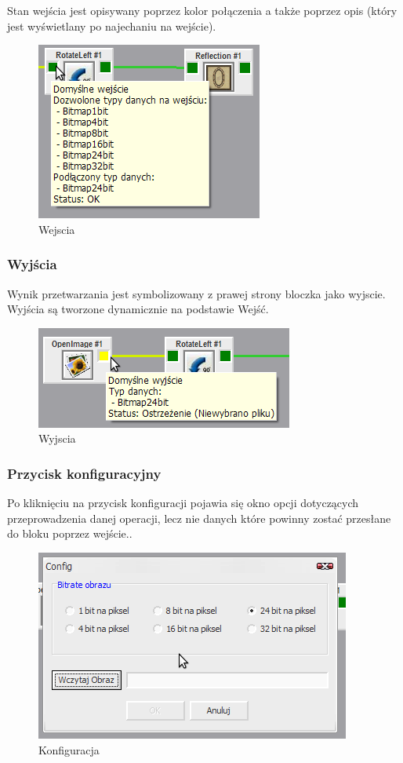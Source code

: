 \documentclass[a4paper,10pt]{article}
\begin{document}
Stan wejścia jest opisywany poprzez kolor połączenia a także poprzez opis (który jest wyświetlany po najechaniu na wejście).
\begin{figure}[h]
 \centering
 \includegraphics[scale=0.5]{wejscia}
 \caption{Wejscia}
 \label{fig:Input}
\end{figure}
\subsubsection{Wyjścia}
Wynik przetwarzania jest symbolizowany z prawej strony bloczka jako wyjscie. Wyjścia są tworzone dynamicznie na podstawie Wejść.
\begin{figure}[h]
 \centering
 \includegraphics[scale=0.5]{wyjscia}
 \caption{Wyjscia}
 \label{fig:Output}
\end{figure}
\subsubsection{Przycisk konfiguracyjny}
Po kliknięciu na przycisk konfiguracji pojawia się okno opcji dotyczących przeprowadzenia danej operacji, lecz nie danych które powinny zostać przesłane do bloku poprzez wejście..
\begin{figure}[h]
 \centering
 \includegraphics[scale=0.5]{config}
 \caption{Konfiguracja}
 \label{fig:config}
\end{figure} 
\end{document}
